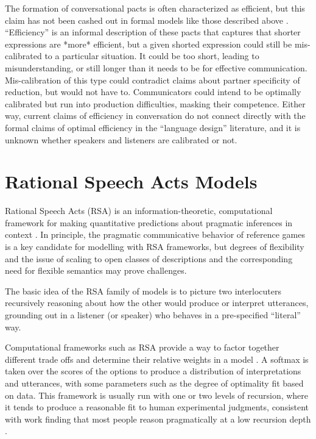 \documentclass[]{article}
\begin{document}
The formation of conversational pacts is often characterized as efficient, but this claim has not been cashed out in formal models like those described above \citep{clark1986, hawkins2020b}. ``Efficiency'' is an informal description of these pacts that captures that shorter expressions are *more* efficient, but a given shorted expression could still be mis-calibrated to a particular situation. It could be too short, leading to misunderstanding, or still longer than it needs to be for effective communication. Mis-calibration of this type could contradict claims about partner specificity of reduction, but would not have to. Communicators could intend to be optimally calibrated but run into production difficulties, masking their competence. Either way, current claims of efficiency in conversation do not connect directly with the formal claims of optimal efficiency in the “language design” literature, and it is unknown whether speakers and listeners are calibrated or not. 


\section{Rational Speech Acts Models}

Rational Speech Acts (RSA) is an information-theoretic, computational framework for making quantitative predictions about pragmatic inferences in context \citep{goodman2016, frank2012a}. In principle, the pragmatic communicative behavior of reference games is a key candidate for modelling with  RSA frameworks, but degrees of flexibility and the issue of scaling to open classes of descriptions and the corresponding need for flexible semantics may prove challenges.  

The basic idea of the RSA family of models is to picture two interlocuters recursively reasoning about how the other would produce or interpret utterances, grounding out in a listener (or speaker) who behaves in a pre-specified ``literal'' way. 

Computational frameworks such as RSA provide a way to factor together different trade offs and determine their relative weights in a model \citep{goodman2016}. A softmax is taken over the scores of the options to produce a distribution of interpretations and utterances, with some parameters such as the degree of optimality fit based on data.  
This framework is usually run with one or two levels of recursion, where it tends to produce a reasonable fit to human experimental judgments, consistent with work finding that most people reason pragmatically at a low recursion depth \citep{franke2016}. 
\end{document}
